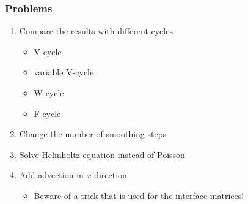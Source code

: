 \begin{frame}
  \frametitle{Problems}
  \begin{enumerate}
  \item Compare the results with different cycles
    \begin{itemize}
    \item V-cycle
    \item variable V-cycle
    \item W-cycle
    \item F-cycle
    \end{itemize}
  \item Change the number of smoothing steps
  \item Solve Helmholtz equation instead of Poisson
  \item Add advection in $x$-direction
    \begin{itemize}
    \item Beware of a trick that is used for the interface matrices!
    \end{itemize}
  \end{enumerate}
\end{frame}
